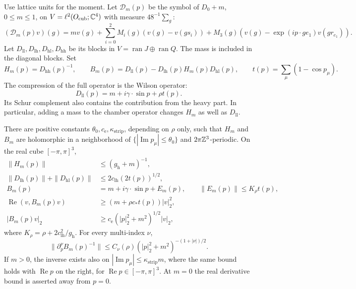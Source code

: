 Use lattice units for the moment. Let $\mathcal D_m(p)$ be the symbol
of $D_0+m$, $0\le m\le1$, on
$V=\ell^2(O_{\mathrm{cub}};\mathbb C^4)$ with measure $48^{-1}\sum_g$:
\[
 (\mathcal D_m(p)v)(g)=m v(g)
 +\sum_{i=0}^2M_i(g)(v(g)-v(gs_i))
 +M_3(g)(v(g)-\exp(ip\cdot ge_1)v(gr_{e_1})).
\]
Let $D_{\mathrm{ll}},D_{\mathrm{lh}},D_{\mathrm{hl}},D_{\mathrm{hh}}$
be its blocks in $V=\operatorname{ran}J\oplus\operatorname{ran}Q$.
The mass is included in the diagonal blocks. Set
\[
 H_m(p)=D_{\mathrm{hh}}(p)^{-1},\qquad
 B_m(p)=D_{\mathrm{ll}}(p)-D_{\mathrm{lh}}(p)H_m(p)D_{\mathrm{hl}}(p),
 \qquad t(p)=\sum_\mu(1-\cos p_\mu).
\]
The compression of the full operator is the Wilson operator:
\[
 D_{\mathrm{ll}}(p)=m+i\gamma\cdot\sin p+\rho t(p).
\]
Its Schur complement also contains the contribution from the heavy
part. In particular, adding a mass to the chamber operator changes
$H_m$ as well as $D_{\mathrm{ll}}$.

\begin{proposition}\label{prop:schur-symbol}
There are positive constants $\theta_0,c_{\mathrm e},\kappa_{\mathrm{strip}}$, depending
on $\rho$ only, such that $H_m$ and $B_m$ are holomorphic in a
neighborhood of $\{|\operatorname{Im}p_\mu|\le\theta_0\}$ and
$2\pi\mathbb Z^3$-periodic. On the real cube $[-\pi,\pi]^3$,
\begin{align}
 \|H_m(p)\|&\le(g_{\mathrm h}+m)^{-1},\label{eq:symbol-heavy}\\
 \|D_{\mathrm{lh}}(p)\|+\|D_{\mathrm{hl}}(p)\|
   &\le2c_{\mathrm{lh}}(2t(p))^{1/2},\label{eq:symbol-cross}\\
 B_m(p)&=m+i\gamma\cdot\sin p+E_m(p),\qquad
 \|E_m(p)\|\le K_\rho t(p),\label{eq:schur-expansion}\\
 \operatorname{Re}(v,B_m(p)v)&\ge(m+\rho c_*t(p))|v|_2^2,
                 \label{eq:schur-realpart}\\
 |B_m(p)v|_2&\ge c_{\mathrm e}(|p|_2^2+m^2)^{1/2}|v|_2,
                 \label{eq:schur-ellipticity}
\end{align}
where $K_\rho=\rho+2c_{\mathrm{lh}}^2/g_{\mathrm h}$. For every
multi-index $\nu$,
\begin{equation}\label{eq:schur-inverse-derivatives}
 \|\partial_p^\nu B_m(p)^{-1}\|
       \le C_\nu(\rho)(|p|_2^2+m^2)^{-(1+|\nu|)/2}.
\end{equation}
If $m>0$, the inverse exists also on
$|\operatorname{Im}p_\mu|\le\kappa_{\mathrm{strip}}m$, where the same bound holds
with $\operatorname{Re}p$ on the right, for
$\operatorname{Re}p\in[-\pi,\pi]^3$. At $m=0$ the real derivative
bound is asserted away from $p=0$.
\end{proposition}

